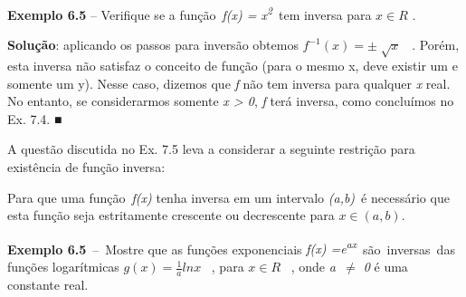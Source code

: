 \documentclass[12pt]{article}
\begin{document}
\begin{enumerate}[label*={\fontsize{14pt}{14pt}\selectfont \textbf{\arabic*.}}]
\vspace{\baselineskip}

\vspace{\baselineskip}
\begin{justify}
\textbf{Exemplo 6.5} – Verifique se a função\  \textit{f(x) = x\textsuperscript{2}}\  tem inversa para \textit{  \( x  \in  R  \) } . 
\end{justify}\par

\begin{adjustwidth}{0.69in}{0.0in}
\begin{justify}
\textbf{Solução}: aplicando os passos para inversão obtemos  \( f^{-1} \left( x \right) = \pm \sqrt[]{x} \) \  . Porém, esta inversa não satisfaz o conceito de função (para o mesmo x, deve existir um e somente um y). Nesse caso, dizemos que \textit{f} não tem inversa para qualquer \textit{x} real. No entanto, se considerarmos somente \textit{x > 0}, \textit{f }terá inversa, como concluímos no Ex. 7.4. ■
\end{justify}\par

\end{adjustwidth}

A questão discutida no Ex. 7.5 leva a considerar a seguinte restrição para existência de função inversa:\par

\par 
Para que uma função\  \textit{f(x) } tenha inversa em um intervalo \textit{(a,b)}\ é necessário que esta  função seja estritamente crescente ou decrescente para  \( x  \in  \left( a,b \right) .  \) \par


\vspace{\baselineskip}

\vspace{\baselineskip}
\textbf{Exemplo 6.5}\ –\ Mostre que as funções exponenciais   \textit{f(x) =e\textsuperscript{ax}}\  são\ inversas\ das funções logarítmicas    \( g \left( x \right) =\frac{1}{a}lnx \) \ ,  para \textit{  \( x  \in  R  \) }\ , onde  \textit{a\  $ \neq $  0 } é uma constante real.\par


\end{enumerate}
\end{document}
